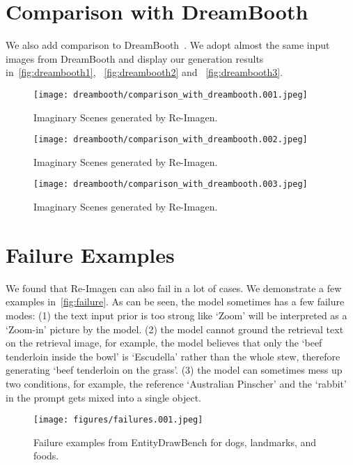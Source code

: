 \documentclass{article} \usepackage{iclr2023_conference,times}
\newcommand{\modelname}{{Re-Imagen}\xspace}
\begin{document}
\clearpage
\section{Comparison with DreamBooth}
\label{appendix:dreambooth}
We also add comparison to DreamBooth~\citep{ruiz2022dreambooth}. We adopt almost the same input images from DreamBooth and display our generation results in~\autoref{fig:dreambooth1}, ~\autoref{fig:dreambooth2} and ~\autoref{fig:dreambooth3}. 
\begin{figure}[!h]
    \centering
    \texttt{[image: dreambooth/comparison\_with\_dreambooth.001.jpeg]}
    \caption{Imaginary Scenes generated by \modelname. }
    \vspace{-1ex}
    \label{fig:dreambooth1}
\end{figure}

\begin{figure}[!h]
    \centering
    \texttt{[image: dreambooth/comparison\_with\_dreambooth.002.jpeg]}
    \caption{Imaginary Scenes generated by \modelname. }
    \vspace{-1ex}
    \label{fig:dreambooth2}
\end{figure}
\begin{figure}[!h]
    \centering
    \texttt{[image: dreambooth/comparison\_with\_dreambooth.003.jpeg]}
    \caption{Imaginary Scenes generated by \modelname. }
    \vspace{-1ex}
    \label{fig:dreambooth3}
\end{figure}

\clearpage
\section{Failure Examples}
We found that \modelname can also fail in a lot of cases.  We demonstrate a few examples in~\autoref{fig:failure}. As can be seen, the model sometimes has a few failure modes: (1) the text input prior is too strong like `Zoom' will be interpreted as a `Zoom-in' picture by the model. (2) the model cannot ground the retrieval text on the retrieval image, for example, the model believes that only the `beef tenderloin inside the bowl' is `Escudella' rather than the whole stew, therefore generating `beef tenderloin on the grass'. (3) the model can sometimes mess up two conditions, for example, the reference `Australian Pinscher' and the `rabbit' in the prompt gets mixed into a single object. 

\begin{figure}[!h]
    \centering
    \texttt{[image: figures/failures.001.jpeg]}
    \caption{Failure examples from EntityDrawBench for dogs, landmarks, and foods. }
    \label{fig:failure}
\end{figure}
\end{document}
